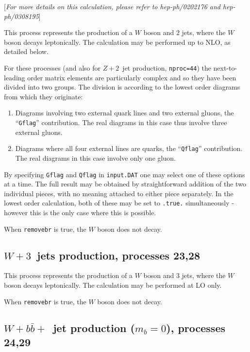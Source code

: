 \documentclass[12pt]{article}
\begin{document}
\begin{center}
[{\it For more details on this calculation, please refer to \break
 hep-ph/0202176 and hep-ph/0308195}]
\end{center}
This process represents the production of a $W$ boson and $2$ jets,
where the $W$ boson decays leptonically. The calculation may be
performed up to NLO, as detailed below.

For these processes (and also for $Z+2$~jet production, {\tt nproc=44})
the next-to-leading order matrix elements are
particularly complex and so they have been divided into two groups.
The division is according to the lowest order diagrams from which they
originate:
\begin{enumerate}
\item Diagrams involving two external quark lines and two external gluons,
the ``{\tt Gflag}'' contribution. The real diagrams in this case thus
involve three external gluons.

\item Diagrams where all four external lines are quarks,
the ``{\tt Qflag}'' contribution. The real diagrams in this case 
involve only one gluon.
\end{enumerate}

By specifying {\tt Gflag} and {\tt Qflag} in {\tt input.DAT} one may
select one of these options at a time. The full result may be obtained
by straightforward addition of the two individual pieces, with no
meaning attached to either piece separately. In the lowest order calculation,
both of these may be set to {\tt .true.} simultaneously - however this is
the only case where this is possible.

When {\tt removebr} is true, the $W$ boson does not decay.

\subsection{$W+3$~jets production, processes 23,28}
\label{subsec:w3jets}

This process represents the production of a $W$ boson and $3$ jets,
where the $W$ boson decays leptonically. The calculation may be
performed at LO only.

When {\tt removebr} is true, the $W$ boson does not decay.

\subsection{$W+b{\bar b}+$~jet production ($m_b=0$), processes 24,29}
\label{subsec:wbbjetmassless}
\end{document}
